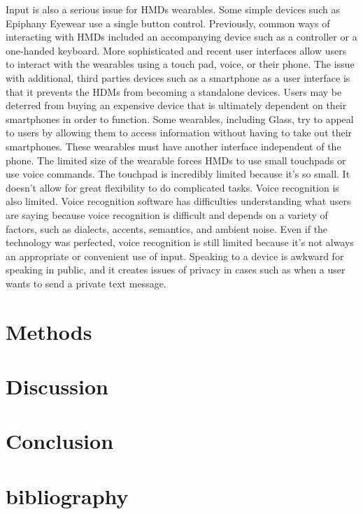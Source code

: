 \documentclass[11pt]{article}
\newcommand{\myreferences}{references}
\begin{document}
Input is also a serious issue for HMDs wearables. Some simple devices such as Epiphany Eyewear use a single button control. Previously, common ways of interacting with HMDs included an accompanying device such as a controller or a one-handed keyboard\cite{inputForHDMs}. More sophisticated and recent user interfaces allow users to interact with the wearables using a  touch pad, voice, or their phone\cite{glassHelp}\cite{userInteractionMultipleDisplays}\cite{inputForHDMs}. The issue with additional, third parties devices such as a smartphone as a user interface is that it prevents the HDMs from becoming a standalone devices. Users may be deterred from buying an expensive device that is ultimately dependent on their smartphones in order to function. Some wearables, including Glass, try to appeal to users by allowing them to access information without having to take out their smartphones. These wearables must have another interface independent of the phone. The limited size of the wearable forces HMDs to use small touchpads or use voice commands. The touchpad is incredibly limited because it's so small. It doesn't allow for great flexibility to do complicated tasks. Voice recognition is also limited. Voice recognition software has difficulties understanding what users are saying because voice recognition is difficult and depends on a variety of factors, such as dialects, accents, semantics, and ambient noise\cite{voiceRecognitionTroubles}. Even if the technology was perfected, voice recognition is still limited because it's not always an appropriate or convenient use of input. Speaking to a device is awkward for speaking in public, and it creates issues of privacy in cases such as when a user wants to send a private text message.       

\section{Methods}
\section{Discussion}
\section{Conclusion}
\section{bibliography}


\end{document}
